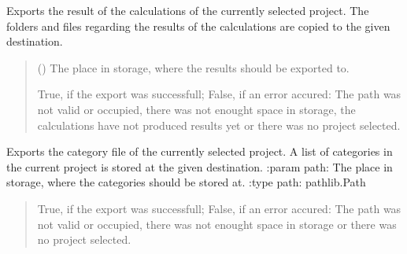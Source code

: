 \documentclass[letterpaper,10pt,english]{sphinxmanual}
\begin{document}
\begin{fulllineitems}
\begin{fulllineitems}
\label{\detokenize{apidoc/src.osm_configurator.control:src.osm_configurator.control.control.Control.export_calculations}}
\pysigstartsignatures
{}
\pysigstopsignatures
\sphinxAtStartPar
Exports the result of the calculations of the currently selected project.
The folders and files regarding the results of the calculations are copied to the given destination.
\begin{quote}\begin{description}
\sphinxAtStartPar
{} () \textendash{} The place in storage, where the results should be exported to.

\sphinxAtStartPar
True, if the export was successfull; False, if an error accured: The path was not valid or occupied, there was not enought space in storage, the calculations have not produced results yet or there was no project selected.

\sphinxAtStartPar
{}

\end{description}\end{quote}

\end{fulllineitems}


\begin{fulllineitems}
\label{\detokenize{apidoc/src.osm_configurator.control:src.osm_configurator.control.control.Control.export_configurations}}
\pysigstartsignatures
{}
\pysigstopsignatures
\sphinxAtStartPar
Exports the category file of the currently selected project.
A list of categories in the current project is stored at the given destination.
:param path: The place in storage, where the categories should be stored at.
:type path: pathlib.Path
\begin{quote}\begin{description}
\sphinxAtStartPar
True, if the export was successfull; False, if an error accured: The path was not valid or occupied, there was not enought space in storage or there was no project selected.


\end{description}
\end{quote}
\end{fulllineitems}
\end{fulllineitems}
\end{document}
